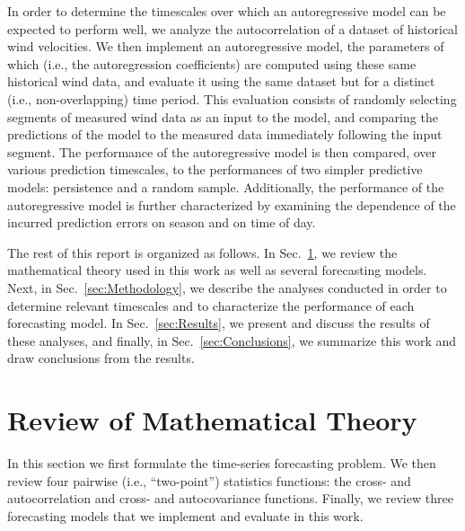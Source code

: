 \documentclass[11pt, oneside]{article}
\newcommand{\secref}[1]{Sec.~\ref{#1}}
\begin{document}
In order to determine the timescales over which an autoregressive model can be expected to perform well, we analyze the autocorrelation of a dataset of historical wind velocities. %
We then implement an autoregressive model, the parameters of which (i.e., the autoregression coefficients) are computed using these same historical wind data, and evaluate it using the same dataset but for a distinct (i.e., non-overlapping) time period.
This evaluation consists of randomly selecting segments of measured wind data as an input to the model, and comparing the predictions of the model to the measured data immediately following the input segment.
The performance of the autoregressive model is then compared, over various prediction timescales, to the performances of two simpler predictive models: persistence and a random sample.
Additionally, the performance of the autoregressive model is further characterized by examining the dependence of the incurred prediction errors on season and on time of day.

The rest of this report is organized as follows.
In \secref{sec:Theory}, we review the mathematical theory used in this work as well as several forecasting models.
Next, in \secref{sec:Methodology}, we describe the analyses conducted in order to determine relevant timescales and to characterize the performance of each forecasting model.
In \secref{sec:Results}, we present and discuss the results of these analyses, and finally,
in \secref{sec:Conclusions}, we summarize this work and draw conclusions from the results.

\section{Review of Mathematical Theory}\label{sec:Theory}
In this section we first formulate the time-series forecasting problem.
We then review four pairwise (i.e., ``two-point'') statistics functions: the cross- and autocorrelation and cross- and autocovariance functions.
Finally, we review three forecasting models that we implement and evaluate in this work.
\end{document}
